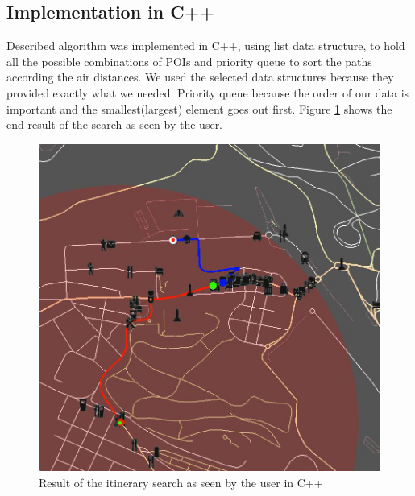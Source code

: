 \subsection{Implementation in C++}
Described algorithm was implemented in C++, using list data structure, to hold all the possible combinations of POIs and priority queue to sort the paths according the air distances. We used the selected data structures because they provided exactly what we needed. Priority queue because the order of our data is important and the smallest(largest) element goes out first. Figure \ref{fig:ite_result_cpp} shows the end result of the search as seen by the user.
\begin{figure}[h]
\centering
\includegraphics[width=0.8\linewidth]{../pictures/search_ite_result.jpg}
\caption{Result of the itinerary search as seen by the user in C++}
\label{fig:ite_result_cpp}
\end{figure}
